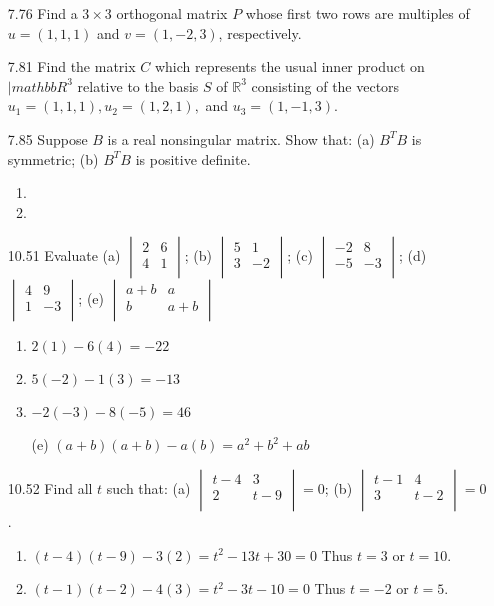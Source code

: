 \documentclass[12pt]{article}
\theoremstyle{definition}
\theoremstyle{plain}
\begin{document}
\begin{enumerate}
\item[7.76]Find a $3\times 3$ orthogonal matrix $P$ whose first two rows are multiples of $u=(1,1,1)$ and $v=(1,-2,3)$, respectively.

\item[7.81]Find the matrix $C$ which represents the usual inner product on $|mathbb{R}^3$ relative to the basis $S$ of $\mathbb{R}^3$ consisting of the vectors $u_1=(1,1,1),u_2=(1,2,1),$ and $u_3=(1,-1,3)$.

\item[7.85]Suppose $B$ is a real nonsingular matrix. Show that: (a) $B^TB$ is symmetric; (b) $B^TB$ is positive definite.
	\begin{enumerate}
	\item
	\item
	\end{enumerate}

\item[10.51]Evaluate (a) $\begin{vmatrix}2&6\\4&1\\\end{vmatrix}$; (b) $\begin{vmatrix}5&1\\3&-2\\\end{vmatrix}$; (c) $\begin{vmatrix}-2&8\\-5&-3\\\end{vmatrix}$; (d) $\begin{vmatrix}4&9\\1&-3\\\end{vmatrix}$; (e) $\begin{vmatrix}a+b&a\\b&a+b\\\end{vmatrix}$
	\begin{enumerate}
	\item $2(1)-6(4) = -22$
	\item $5(-2)-1(3) = -13$
	\item $-2(-3)-8(-5) = 46$
	\item[(e)] $(a+b)(a+b)-a(b) = a^2+b^2+ab$
	\end{enumerate}

\item[10.52]Find all $t$ such that: (a) $\begin{vmatrix}t-4&3\\2&t-9\\\end{vmatrix} = 0$; (b) $\begin{vmatrix}t-1&4\\3&t-2\\\end{vmatrix} = 0$.
	\begin{enumerate}
	\item $(t-4)(t-9)-3(2) = t^2-13t+30 = 0$ Thus $t=3$ or $t=10$.
	\item $(t-1)(t-2)-4(3) = t^2-3t-10 = 0$ Thus $t=-2$ or $t=5$.
	\end{enumerate}


\end{enumerate}
\end{document}
